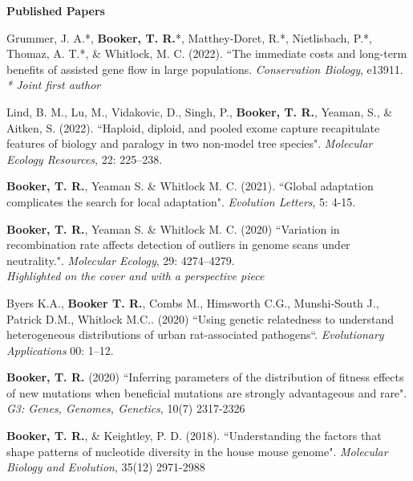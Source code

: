 \documentclass[11pt]{article}
\makeatletter
\newlength{\bibhang}
\newlength{\bibsep}
 {\@listi \global\bibsep\itemsep \global\advance\bibsep by\parsep}
\newenvironment{bibsection}%
        {\begin{etaremune}{}{%
       \setlength{\leftmargin}{\bibhang}%
       \setlength{\itemindent}{-\leftmargin}%
       \setlength{\itemsep}{\bibsep}%
       \setlength{\parsep}{\z@}%
        \setlength{\partopsep}{0pt}%
        \setlength{\topsep}{0pt}}}
        {\end{etaremune}\vspace{-.6\baselineskip}}
\makeatother
\begin{document}
\vspace{.1275in}
\textbf{Published Papers}

\begin{bibsection}

	\item Grummer, J. A.*, \textbf{Booker, T. R.}*, Matthey-Doret, R.*, Nietlisbach, P.*, Thomaz, A. T.*, \& Whitlock, M. C. (2022). ``The immediate costs and long-term benefits of assisted gene flow in large populations. \textit{Conservation Biology}, e13911.\\
     \emph{* Joint first author}

      \item Lind, B. M., Lu, M., Vidakovic, D., Singh, P., { \bf Booker, T. R.}, Yeaman, S., \& Aitken, S. (2022). ``Haploid, diploid, and pooled exome capture recapitulate features of biology and paralogy in two non-model tree species". \emph{Molecular Ecology Resources}, 22: 225–238. 
  
    \item {\bf Booker, T. R.}, Yeaman S. \& Whitlock M. C. (2021). ``Global adaptation complicates the search for local adaptation".  \emph{Evolution Letters}, 5: 4-15. 

    \item {\bf Booker, T. R.}, Yeaman S. \& Whitlock M. C. (2020) ``Variation in recombination rate affects detection of outliers in genome scans under neutrality.". \emph{Molecular Ecology}, 29: 4274–4279.\\ \emph{Highlighted on the cover and with a perspective piece}

	\item Byers K.A., {\bf Booker T. R.}, Combs M., Himsworth C.G., Munshi-South J., Patrick D.M., Whitlock M.C.. (2020)  ``Using genetic relatedness to understand heterogeneous distributions of urban rat-associated pathogens``. \emph{Evolutionary Applications} 00: 1–12.
   
    \item {\bf Booker, T. R.} (2020) ``Inferring parameters of the distribution of fitness effects of new mutations when beneficial mutations are strongly advantageous and rare". \\
     \emph{G3: Genes, Genomes, Genetics}, 10(7) 2317-2326

    \item {\bf Booker, T. R.}, \& Keightley, P. D. (2018). ``Understanding the factors that shape patterns of nucleotide diversity in the house mouse genome". \emph{Molecular Biology and Evolution}, 35(12) 2971-2988
    

\end{bibsection}
\end{document}
